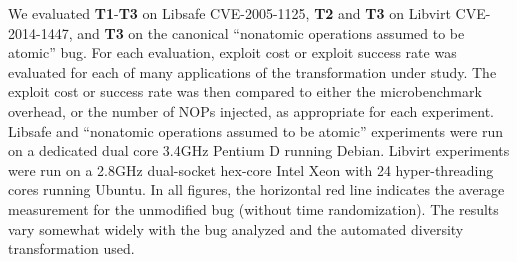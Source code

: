 We evaluated \textbf{T1}-\textbf{T3} on Libsafe CVE-2005-1125, \textbf{T2} and \textbf{T3} on Libvirt CVE-2014-1447, and \textbf{T3} on the canonical ``nonatomic operations assumed to be atomic'' bug.
For each evaluation, exploit cost or exploit success rate was evaluated for each of many applications of the transformation under study.
The exploit cost or success rate was then compared to either the microbenchmark overhead, or the number of NOPs injected, as appropriate for each experiment.
Libsafe and ``nonatomic operations assumed to be atomic'' experiments were run on a dedicated dual core 3.4GHz Pentium D running Debian.
Libvirt experiments were run on a 2.8GHz dual-socket hex-core Intel Xeon with 24 hyper-threading cores running Ubuntu.
In all figures, the horizontal red line indicates the average measurement for the unmodified bug (without time randomization).
The results vary somewhat widely with the bug analyzed and the automated diversity transformation used.

